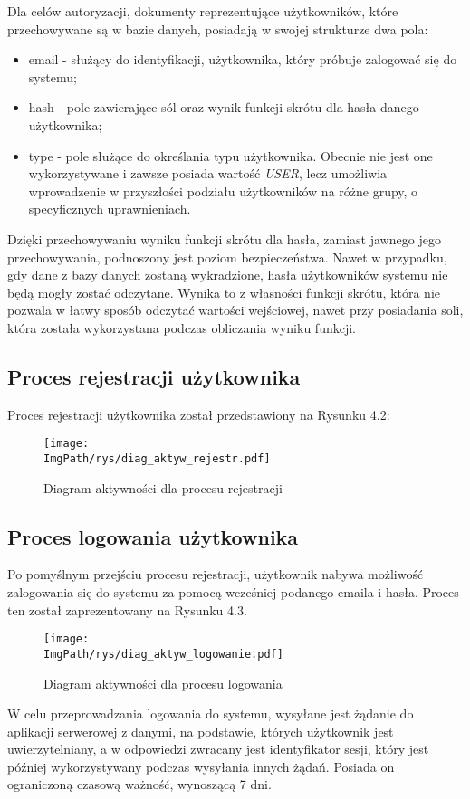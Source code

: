 \documentclass[a4paper,12pt,twoside,openany]{report}
\newcommand{\ImgPath}{.}
\begin{document}
Dla celów autoryzacji, dokumenty reprezentujące użytkowników, które przechowywane są w bazie danych, posiadają w swojej strukturze dwa pola:
\begin{itemize}
	\item email - służący do identyfikacji, użytkownika, który próbuje zalogować się do systemu;
	
	\item hash - pole zawierające sól oraz wynik funkcji skrótu dla hasła danego użytkownika;
	
	\item type - pole służące do określania typu użytkownika. Obecnie nie jest one wykorzystywane i zawsze posiada wartość \textit{USER}, lecz umożliwia wprowadzenie w przyszłości podziału użytkowników na różne grupy, o specyficznych uprawnieniach.
	
\end{itemize}
Dzięki przechowywaniu wyniku funkcji skrótu dla hasła, zamiast jawnego jego przechowywania, podnoszony jest poziom bezpieczeństwa. Nawet w przypadku, gdy dane z bazy danych zostaną wykradzione, hasła użytkowników systemu nie będą mogły zostać odczytane. Wynika to z własności funkcji skrótu, która nie pozwala w łatwy sposób odczytać wartości wejściowej, nawet przy posiadania soli, która została wykorzystana podczas obliczania wyniku funkcji.


\subsection{Proces rejestracji użytkownika}
Proces rejestracji użytkownika został przedstawiony na Rysunku 4.2:
 \begin{figure}[!htbp]
	\begin{center}
		\centering
		\texttt{[image: \\ImgPath/rys/diag\_aktyw\_rejestr.pdf]}
	\end{center}
	\caption{Diagram aktywności dla procesu rejestracji}
	\label{diagramAktywnosciRejstracja}
\end{figure}
\newpage

\subsection{Proces logowania użytkownika}
Po pomyślnym przejściu procesu rejestracji, użytkownik nabywa możliwość zalogowania się do systemu za pomocą wcześniej podanego emaila i hasła. Proces ten został zaprezentowany na Rysunku 4.3.


\begin{figure}[!htbp]
	\begin{center}
		\centering
		\texttt{[image: \\ImgPath/rys/diag\_aktyw\_logowanie.pdf]}
	\end{center}
	\caption{Diagram aktywności dla procesu logowania}
	\label{diagramAktywnosciLogowanie}
\end{figure}
\newpage
W celu przeprowadzania logowania do systemu, wysyłane jest żądanie do aplikacji serwerowej z danymi, na podstawie, których użytkownik jest uwierzytelniany, a w odpowiedzi zwracany jest identyfikator sesji, który jest później wykorzystywany podczas wysyłania innych żądań. Posiada on ograniczoną czasową ważność, wynoszącą 7 dni.
\end{document}
